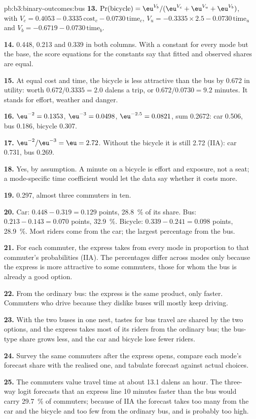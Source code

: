 \begin{solution}{pb:b3:binary-outcomes:bus}
\textbf{13.} $\Pr(\text{bicycle}) = \eu^{V_b}/(\eu^{V_c} + \eu^{V_u} + \eu^{V_b})$,
with $V_c = 0.4053 - 0.3335\,\text{cost}_c - 0.0730\,\text{time}_c$, $V_u =
-0.3335 \times 2.5 - 0.0730\,\text{time}_u$ and $V_b = -0.6719 -
0.0730\,\text{time}_b$.

\textbf{14.} 0.448, 0.213 and 0.339 in both columns. %
With a constant for every mode but the base, the score equations for the
constants say that fitted and observed shares are equal.

\textbf{15.} At equal cost and time, the bicycle is less attractive than the bus
by 0.672 in utility: worth $0.672/0.3335 = 2.0$ dalens a trip, or $0.672/0.0730
= 9.2$ minutes. It stands for effort, weather and danger.

\textbf{16.} $\eu^{-2} = 0.1353$, $\eu^{-3} = 0.0498$, $\eu^{-2.5} = 0.0821$, sum
0.2672: car 0.506, bus 0.186, bicycle 0.307.

\textbf{17.} $\eu^{-2}/\eu^{-3} = \eu = 2.72$. Without the bicycle it is still
2.72 (IIA): car 0.731, bus 0.269.

\textbf{18.} Yes, by assumption. A minute on a bicycle is effort and exposure,
not a seat; a mode-specific time coefficient would let the data say whether it
costs more.

\textbf{19.} 0.297, almost three commuters in ten.

\textbf{20.} Car: $0.448 - 0.319 = 0.129$ points, 28.8~\% of its share. Bus:
$0.213 - 0.143 = 0.070$ points, 32.9~\%. Bicycle: $0.339 - 0.241 = 0.098$ points,
28.9~\%. Most riders come from the car; the largest percentage from the bus.

\textbf{21.} For each commuter, the express takes from every mode in proportion
to that commuter's probabilities (IIA). The percentages differ across modes only
because the express is more attractive to some commuters, those for whom the
bus is already a good option.

\textbf{22.} From the ordinary bus: the express is the same product, only
faster. Commuters who drive because they dislike buses will mostly keep
driving.

\textbf{23.} With the two buses in one nest, tastes for bus travel are shared
by the two options, and the express takes most of its riders from the ordinary
bus; the bus-type share grows less, and the car and bicycle lose fewer riders.

\textbf{24.} Survey the same commuters after the express opens, compare each
mode's forecast share with the realised one, and tabulate forecast against
actual choices.

\textbf{25.} The commuters value travel time at about 13.1 dalens an hour. The
three-way logit forecasts that an express line 10 minutes faster than the bus
would carry 29.7~\% of commuters; because of IIA the forecast takes too many from
the car and the bicycle and too few from the ordinary bus, and is probably too
high.
\end{solution}
